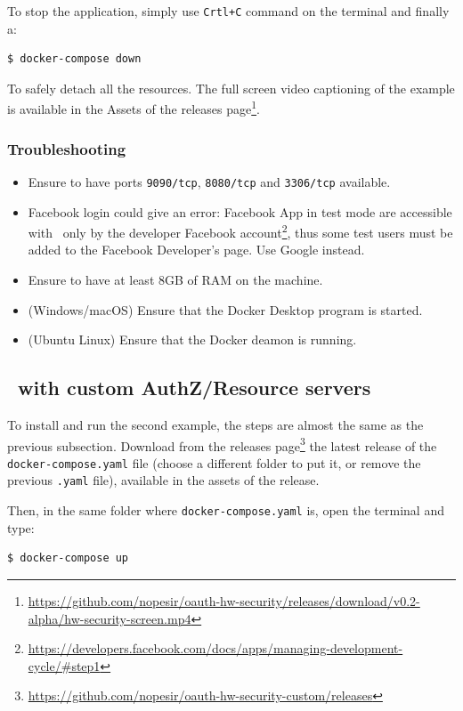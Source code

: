 \noindent To stop the application, simply use \texttt{Crtl+C} command on the terminal and finally a:
\begin{lstlisting}[language=bash]
  $ docker-compose down
\end{lstlisting}

\noindent To safely detach all the resources.
The full screen video captioning of the example is available in the Assets of the releases page\footnote{\scriptsize{\url{https://github.com/nopesir/oauth-hw-security/releases/download/v0.2-alpha/hw-security-screen.mp4}}}. 

\subsubsection{Troubleshooting}
\begin{itemize}
    \item Ensure to have ports \texttt{9090/tcp}, \texttt{8080/tcp} and \texttt{3306/tcp} available.
    \item Facebook login could give an error: Facebook App in test mode are accessible with \oauth\ only by the developer Facebook account\footnote{\url{https://developers.facebook.com/docs/apps/managing-development-cycle/\#step1}}, thus some test users must be added to the Facebook Developer's page. Use Google instead.
    \item Ensure to have at least 8GB of RAM on the machine.
    \item (Windows/macOS) Ensure that the Docker Desktop program is started.
    \item (Ubuntu Linux) Ensure that the Docker deamon is running.
\end{itemize}

\subsection{\oauth\ with custom AuthZ/Resource servers}
To install and run the second example, the steps are almost the same as the previous subsection. Download from the releases page\footnote{\url{https://github.com/nopesir/oauth-hw-security-custom/releases}} the latest release of the \texttt{docker-compose.yaml} file (choose a different folder to put it, or remove the previous \texttt{.yaml} file), available in the assets of the release.

\noindent Then, in the same folder where \texttt{docker-compose.yaml} is, open the terminal and type:
\begin{lstlisting}[language=bash]
  $ docker-compose up
\end{lstlisting}

